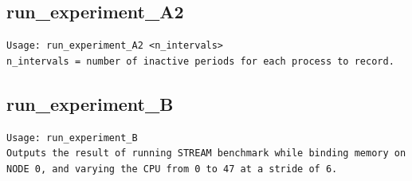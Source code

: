 \documentclass{article}
\begin{document}
\subsection{run\_experiment\_A2}
\begin{lstlisting}
Usage: run_experiment_A2 <n_intervals>
n_intervals = number of inactive periods for each process to record.
\end{lstlisting}
\subsection{run\_experiment\_B}
\begin{lstlisting}
Usage: run_experiment_B
Outputs the result of running STREAM benchmark while binding memory on NODE 0, and varying the CPU from 0 to 47 at a stride of 6.
\end{lstlisting}
\end{document}
